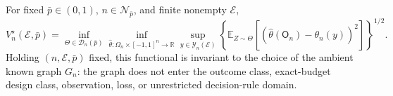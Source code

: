 For fixed \(\bar p\in(0,1)\), \(n\in\mathcal N_{\bar p}\), and finite nonempty \(\mathcal E\),
\[
V_n^\star(\mathcal E,\bar p)
=\inf_{\Theta\in\mathcal D_n(\bar p)}
 \inf_{\widehat\theta:\Omega_n\times[-1,1]^n\to\mathbb R}
 \sup_{y\in\mathcal Y_n(\mathcal E)}
 \left\{\mathbb E_{Z\sim\Theta}
 \left[(\widehat\theta(\mathsf O_n)-\theta_n(y))^2\right]\right\}^{1/2}.
\]
Holding \((n,\mathcal E,\bar p)\) fixed, this functional is invariant to the choice of the ambient known graph \(G_n\): the graph does not enter the outcome class, exact-budget design class, observation, loss, or unrestricted decision-rule domain.